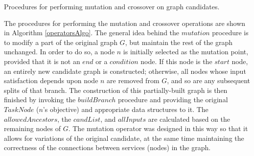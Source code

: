 \begin{algorithm}
 \setlength{}
  
  
 \LinesNumbered
 \SetNlSty{}{}{:}

 
 
 \caption{\footnotesize Procedures for performing mutation and crossover on graph candidates.}
\label{operatorsAlgo}
\end{algorithm}

The procedures for performing the mutation and crossover operations are shown in Algorithm \ref{operatorsAlgo}. The general idea behind the $mutation$ procedure is to modify a part of the original graph $G$, but maintain the rest of the graph unchanged. In order to do so, a node $n$ is initially selected as the mutation point, provided that it is not an $end$ or a $condition$ node. If this node is the $start$ node, an entirely new candidate graph is constructed; otherwise, all nodes whose input satisfaction depends upon node $n$ are removed from $G$, and so are any subsequent splits of that branch. The construction of this partially-built graph is then finished by invoking the $buildBranch$ procedure and providing the original $TaskNode$ ($n$'s objective) and appropriate data structures to it. The $allowedAncestors$, the $candList$, and $allInputs$ are calculated based on the remaining nodes of $G$. The mutation operator was designed in this way so that it allows for variations of the original candidate, at the same time maintaining the correctness of the connections between services (nodes) in the graph.

